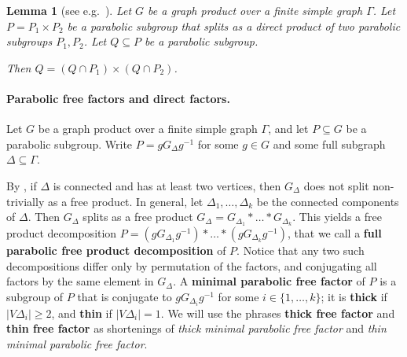 \documentclass[a4paper,english,11pt]{article}
\newtheorem{lemma}[de]{Lemma}
\theoremstyle{definition}
\theoremstyle{remark}
\newcommand{\deffont}[1]{\textbf{#1}}
\begin{document}
\begin{lemma}[{see e.g.\ \cite[Lemma 2.7]{EH}}]\label{lemma:parabolic-in-product}
    Let $G$ be a graph product over a finite simple graph $\Gamma$. Let $P=P_1\times P_2$ be a parabolic subgroup that splits as a direct product of two parabolic subgroups $P_1,P_2$. Let $Q\subseteq P$ be a parabolic subgroup.

    Then $Q=(Q\cap P_1)\times (Q\cap P_2)$.
\end{lemma}

\paragraph*{Parabolic free factors and direct factors.} Let $G$ be a graph product over a finite simple graph $\Gamma$, and let $P\subseteq G$ be a parabolic subgroup. Write $P=gG_\Delta g^{-1}$ for some $g\in G$ and some full subgraph $\Delta\subseteq \Gamma$. \label{thick}

By \cite[Lemma~4.7]{Gre}, if $\Delta$ is connected and has at least two vertices, then $G_\Delta$ does not split non-trivially as a free product. In general, let $\Delta_1,\dots,\Delta_k$ be the connected components of $\Delta$. Then $G_\Delta$ splits as a free product $G_{\Delta}=G_{\Delta_1}\ast\dots\ast G_{\Delta_k}$. This yields a free product decomposition $P=(gG_{\Delta_1}g^{-1})\ast\dots\ast (gG_{\Delta_k}g^{-1})$, that we call a \deffont{full parabolic free product decomposition} of $P$. Notice that any two such decompositions differ only by permutation of the factors, and conjugating all factors by the same element in $G_{\Delta}$. A \deffont{minimal parabolic free factor} of $P$ is a subgroup of $P$ that is conjugate to $gG_{\Delta_i}g^{-1}$ for some $i\in\{1,\dots,k\}$; it is \deffont{thick} if $|V\Delta_i|\ge 2$, and \deffont{thin} if $|V\Delta_i|=1$. We will use the phrases 
\deffont{thick free factor} and \deffont{thin free factor} as shortenings of \emph{thick minimal parabolic free factor} and \emph{thin minimal parabolic free factor}.
\end{document}
